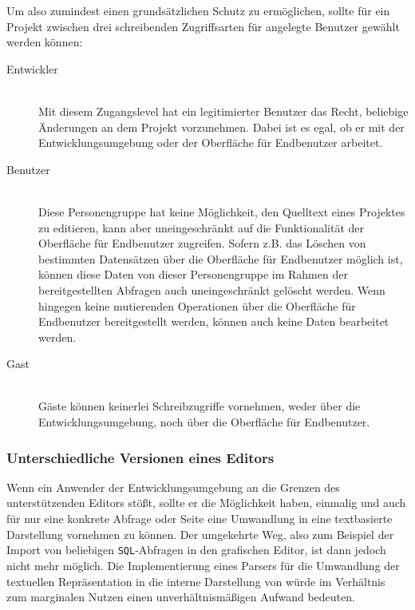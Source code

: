 Um also zumindest einen grundsätzlichen Schutz zu ermöglichen, sollte für ein Projekt zwischen drei schreibenden Zugriffsarten für angelegte Benutzer gewählt werden können:


\begin{description}
  \item[Entwickler] \hfill \\
    Mit diesem Zugangslevel hat ein legitimierter Benutzer das Recht, beliebige Änderungen an dem Projekt vorzunehmen. Dabei ist es egal, ob er mit der Entwicklungsumgebung oder der Oberfläche für Endbenutzer arbeitet.
  \item[Benutzer] \hfill \\
    Diese Personengruppe hat keine Möglichkeit, den Quelltext eines Projektes zu editieren, kann aber uneingeschränkt auf die Funktionalität der Oberfläche für Endbenutzer zugreifen. Sofern z.B. das Löschen von bestimmten Datensätzen über die Oberfläche für Endbenutzer möglich ist, können diese Daten von dieser Personengruppe im Rahmen der bereitgestellten Abfragen auch uneingeschränkt gelöscht werden. Wenn hingegen keine mutierenden Operationen über die Oberfläche für Endbenutzer bereitgestellt werden, können auch keine Daten bearbeitet werden.
  \item[Gast] \hfill \\
    Gäste können keinerlei Schreibzugriffe vornehmen, weder über die Entwicklungsumgebung, noch über die Oberfläche für Endbenutzer.
\end{description}

\subsubsection{Unterschiedliche Versionen eines Editors}
\label{sec:editor-different-versions}

Wenn ein Anwender der Entwicklungsumgebung an die Grenzen des unterstützenden Editors stößt, sollte er die Möglichkeit haben, einmalig und auch für nur eine konkrete Abfrage oder Seite eine Umwandlung in eine textbasierte Darstellung vornehmen zu können. Der umgekehrte Weg, also zum Beispiel der Import von beliebigen \texttt{SQL}-Abfragen in den grafischen Editor, ist dann jedoch nicht mehr möglich. Die Implementierung eines Parsers für die Umwandlung der textuellen Repräsentation in die interne Darstellung von \idename{} würde im Verhältnis zum marginalen Nutzen einen unverhältnismäßigen Aufwand bedeuten.

